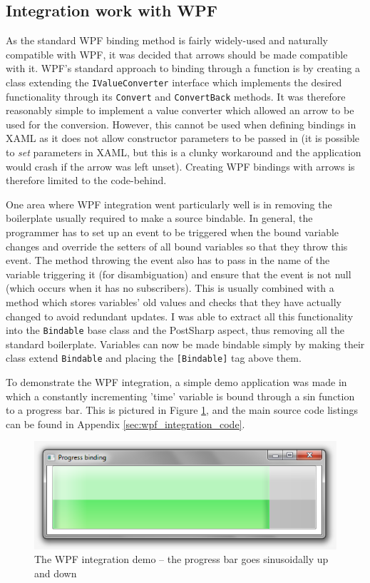 \documentclass[12pt,twoside,notitlepage]{report}
\begin{document}
\subsection{Integration work with WPF}

As the standard WPF binding method is fairly widely-used and naturally compatible with WPF, it was decided that arrows should be made compatible with it. WPF's standard approach to binding through a function is by creating a class extending the \texttt{IValueConverter} interface which implements the desired functionality through its \texttt{Convert} and \texttt{ConvertBack} methods. It was therefore reasonably simple to implement a value converter which allowed an arrow to be used for the conversion. However, this cannot be used when defining bindings in XAML as it does not allow constructor parameters to be passed in (it is possible to \textit{set} parameters in XAML, but this is a clunky workaround and the application would crash if the arrow was left unset). Creating WPF bindings with arrows is therefore limited to the code-behind.

One area where WPF integration went particularly well is in removing the boilerplate usually required to make a source bindable. In general, the programmer has to set up an event to be triggered when the bound variable changes and override the setters of all bound variables so that they throw this event. The method throwing the event also has to pass in the name of the variable triggering it (for disambiguation) and ensure that the event is not null (which occurs when it has no subscribers). This is usually combined with a method which stores variables' old values and checks that they have actually changed to avoid redundant updates. I was able to extract all this functionality into the \texttt{Bindable} base class and the PostSharp aspect, thus removing all the standard boilerplate. Variables can now be made bindable simply by making their class extend \texttt{Bindable} and placing the \texttt{[Bindable]} tag above them.

To demonstrate the WPF integration, a simple demo application was made in which a constantly incrementing 'time' variable is bound through a sin function to a progress bar. This is pictured in Figure \ref{fig:wpf_integration_demo}, and the main source code listings can be found in Appendix \ref{sec:wpf_integration_code}.

\begin{figure}[!ht]
  \centering
  \includegraphics[width=\textwidth]{fig/WPFIntegrationDemo.png}
  \caption[WPF integration demo]{The WPF integration demo -- the progress bar goes sinusoidally up and down}
  \label{fig:wpf_integration_demo}
\end{figure}
\end{document}
